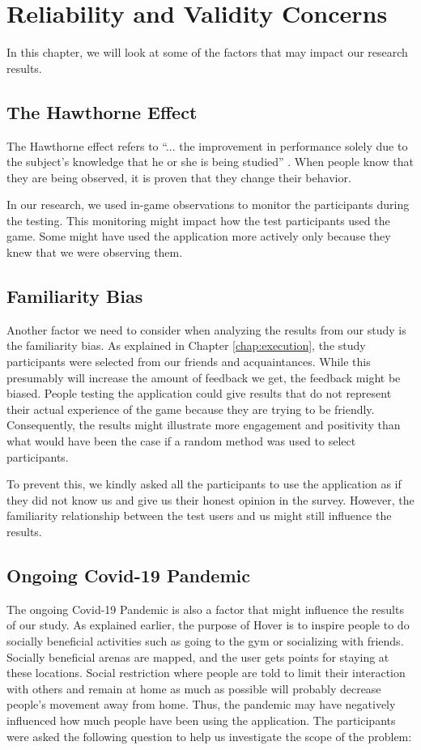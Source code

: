 \section{Reliability and Validity Concerns}
\label{chap:reliability_and_validity}
In this chapter, we will look at some of the factors that may impact our research results.

\subsection{The Hawthorne Effect}
The Hawthorne effect refers to “... the improvement in performance solely due to the subject's knowledge that he or she is being studied” \citep{fox_clinical_2008}. When people know that they are being observed, it is proven that they change their behavior. 

In our research, we used in-game observations to monitor the participants during the testing. This monitoring might impact how the test participants used the game. Some might have used the application more actively only because they knew that we were observing them.

\subsection{Familiarity Bias}
Another factor we need to consider when analyzing the results from our study is the familiarity bias. As explained in Chapter \ref{chap:execution}, the study participants were selected from our friends and acquaintances. While this presumably will increase the amount of feedback we get, the feedback might be biased. People testing the application could give results that do not represent their actual experience of the game because they are trying to be friendly. Consequently, the results might illustrate more engagement and positivity than what would have been the case if a random method was used to select participants.

To prevent this, we kindly asked all the participants to use the application as if they did not know us and give us their honest opinion in the survey. However, the familiarity relationship between the test users and us might still influence the results.

\subsection{Ongoing Covid-19 Pandemic}
The ongoing Covid-19 Pandemic is also a factor that might influence the results of our study. As explained earlier, the purpose of Hover is to inspire people to do socially beneficial activities such as going to the gym or socializing with friends. Socially beneficial arenas are mapped, and the user gets points for staying at these locations. Social restriction where people are told to limit their interaction with others and remain at home as much as possible will probably decrease people’s movement away from home. Thus, the pandemic may have negatively influenced how much people have been using the application. The participants were asked the following question to help us investigate the scope of the problem: 

